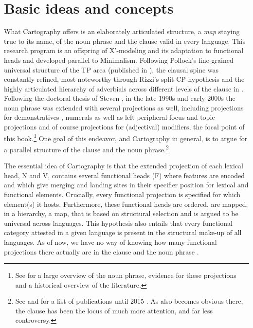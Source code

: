 \section{Basic ideas and concepts} \label{sectioncarto}
\largerpage[-3]
What Cartography offers is an elaborately articulated structure, a \textit{map} staying true to its name, of the noun phrase and the clause valid in every language. This research program is an offspring of X'-modeling and its adaptation to functional heads \citep{chomsky:1986:barriers} and developed parallel to Minimalism. Following Pollock’s fine-grained universal structure of the TP area (published in \citealt{pollock:1989:verb}), the clausal spine was constantly refined, most noteworthy through Rizzi’s split-CP-hypothesis \citep{rizzi:1997:the} and the highly articulated hierarchy of adverbials across different levels of the clause in \citet{cinque:1999:adverbs}. Following the doctoral thesis of Steven \citet{abney:1987:the}, in the late 1990s and early 2000s the noun phrase was extended with several projections as well, including projections for demonstratives \citep{bruge:2002:positions}, numerals \citep{ritter:1991:two, ritter:1993:where} as well as left-peripheral focus and topic projections \citep{dimitrova:1998:fragments, ihsane:2001:specific, aboh:2004:topic, aboh:2006:when} and of course projections for (adjectival) modifiers, the focal point of this book.\footnote{See \citet{alex:2007:nounphrase} for a large overview of the noun phrase, evidence for these projections and a historical overview of the literature.} One goal of this endeavor, and Cartography in general, is to argue for a parallel structure of the clause and the noun phrase.\footnote{See \citet{cinque:1993:evidence, cinque:1999:adverbs, cinque:2010:adj, cinque:2020:relcl, rizzi:1997:the, rizzi:2004:the, cinriz:2010:carto} and for a list of publications until 2015 \citet[144–151]{cinriz:2016:functional}. As also becomes obvious there, the clause has been the locus of much more attention, and far less controversy.}

The essential idea of Cartography is that the extended projection of each lexical head, N and V, contains several functional heads (F) where features are encoded and which give merging and landing sites in their specifier position for lexical and functional elements. Crucially, every functional projection is specified for which element(s) it hosts. Furthermore, these functional heads are ordered, are mapped, in a hierarchy, a map, that is based on structural selection and is argued to be universal across languages. This hypothesis also entails that every functional category attested in a given language is present in the structural make-up of all languages. As of now, we have no way of knowing how many functional projections there actually are in the clause and the noun phrase \citep[154–157]{cinriz:2016:functional}.

